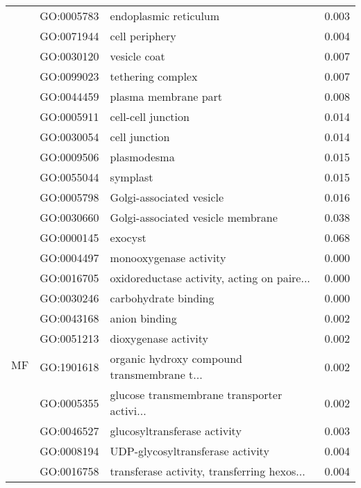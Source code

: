 \begin{longtable}{lllr}
   & GO:0005783 &                        endoplasmic reticulum &         0.003 \\
   & GO:0071944 &                               cell periphery &         0.004 \\
   & GO:0030120 &                                 vesicle coat &         0.007 \\
   & GO:0099023 &                            tethering complex &         0.007 \\
   & GO:0044459 &                         plasma membrane part &         0.008 \\
   & GO:0005911 &                           cell-cell junction &         0.014 \\
   & GO:0030054 &                                cell junction &         0.014 \\
   & GO:0009506 &                                  plasmodesma &         0.015 \\
   & GO:0055044 &                                     symplast &         0.015 \\
   & GO:0005798 &                     Golgi-associated vesicle &         0.016 \\
   & GO:0030660 &            Golgi-associated vesicle membrane &         0.038 \\
   & GO:0000145 &                                      exocyst &         0.068 \\
\cline{1-4}
\multirow{48}{*}{MF} & GO:0004497 &                       monooxygenase activity &         0.000 \\
   & GO:0016705 &  oxidoreductase activity, acting on paire... &         0.000 \\
   & GO:0030246 &                         carbohydrate binding &         0.000 \\
   & GO:0043168 &                                anion binding &         0.002 \\
   & GO:0051213 &                         dioxygenase activity &         0.002 \\
   & GO:1901618 &  organic hydroxy compound transmembrane t... &         0.002 \\
   & GO:0005355 &  glucose transmembrane transporter activi... &         0.002 \\
   & GO:0046527 &                 glucosyltransferase activity &         0.003 \\
   & GO:0008194 &             UDP-glycosyltransferase activity &         0.004 \\
   & GO:0016758 &  transferase activity, transferring hexos... &         0.004 \\

\end{longtable}
